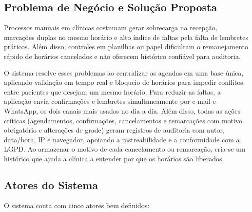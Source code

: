 \documentclass[12pt,a4paper]{article}
\begin{document}
\subsection{Problema de Negócio e Solução Proposta}\label{sec:problema}

Processos manuais em clínicas costumam gerar sobrecarga na recepção,
marcações duplas no mesmo horário e alto índice de faltas pela falta de
lembretes práticos. Além disso, controles em planilhas ou papel
dificultam o remanejamento rápido de horários cancelados e não oferecem
histórico confiável para auditoria.

O sistema resolve esses problemas ao centralizar as agendas em uma base
única, aplicando validação em tempo real e bloqueio de horários para
impedir conflitos entre pacientes que desejam um mesmo horário. Para
reduzir as faltas, a aplicação envia confirmações e lembretes
simultaneamente por e-mail e WhatsApp, os dois canais mais usados no dia
a dia. Além disso, todas as ações críticas (agendamentos, confirmações,
cancelamentos e remarcações com motivo obrigatório e alterações de
grade) geram registros de auditoria com autor, data/hora, IP e
navegador, apoiando a rastreabilidade e a conformidade com a LGPD. Ao
armazenar o motivo de cada cancelamento ou remarcação, cria-se um histórico
que ajuda a clínica a entender por que os horários são liberados.

\subsection{Atores do Sistema}\label{sec:atores}

O sistema conta com cinco atores bem definidos:
\end{document}
